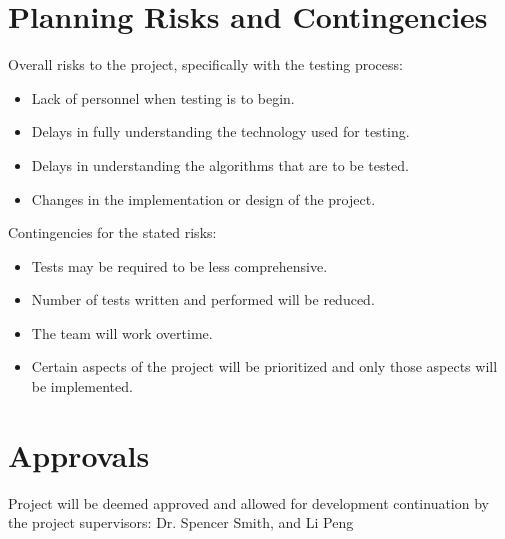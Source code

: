 \documentclass[12pt]{article}
\begin{document}
\section{Planning Risks and Contingencies}
Overall risks to the project, specifically with the testing process:
  \begin{itemize}
    \item Lack of personnel when testing is to begin.
    \item Delays in fully understanding the technology used for testing.
    \item Delays in understanding the algorithms that are to be tested.
    \item Changes in the implementation or design of the project.
  \end{itemize}
Contingencies for the stated risks:
  \begin{itemize}
    \item Tests may be required to be less comprehensive.
    \item Number of tests written and performed will be reduced.
    \item The team will work overtime.
    \item Certain aspects of the project will be prioritized and only those aspects will be implemented.
  \end{itemize}
\section{Approvals}
Project will be deemed approved and allowed for development continuation by the project supervisors: Dr. Spencer Smith, and Li Peng
\end{document}
